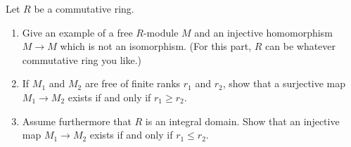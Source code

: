 \begin{question}[subtitle = August 2020 Problem 4,ID=Aug20_4]
Let $R$ be a commutative ring.
\begin{enumerate}
    \item Give an example of a free $R$-module $M$ and an injective homomorphism $M\to M$ which is not an isomorphism. (For this part, $R$ can be whatever commutative ring you like.)
    \item If $M_1$ and $M_2$ are free of finite ranks $r_1$ and $r_2$, show that a surjective map $M_1\to M_2$ exists if and only if $r_1\geq r_2$.
    \item Assume furthermore that $R$ is an integral domain. Show that an injective map $M_1\to M_2$ exists if and only if $r_1\leq r_2$.
\end{enumerate}
\end{question}
